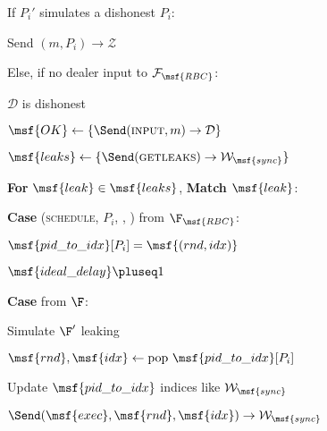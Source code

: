 
\begin{bbox}[title={Algorithm $\msf{SimPartyOutput}(m, P_i')$}]

	\begin{renumerate}
		\item If $P_i'$ simulates a dishonest $P_i$:
		\begin{renumerate}	

			\item Send $(m, P_i) \rightarrow \mathcal{Z}$
		\end{renumerate}

		\item Else, if no dealer input to $\mathcal{F}_\msf{RBC}$:
		\begin{renumerate}

			\item \Assert $\mathcal{D}$ is dishonest

			\item $\msf{OK} \leftarrow \{ \Send (\textsc{input}, m) \rightarrow \mathcal{D} \}$

			\item $\msf{leaks} \leftarrow \{ \Send (\textsc{getleaks}) \rightarrow \mathcal{W}_\msf{sync}\}$
		
			\item {\bf For} $\msf{leak} \in \msf{leaks}$, {\bf Match} $\msf{leak}$:
						\begin{renumerate}
							\item {\bf Case} (\textsc{schedule}, $P_i$, , ) from $\F_\msf{RBC}$:

								\quad $\msf{pid\_to\_idx}[P_i] = \msf{(rnd, idx)}$

								\quad $\msf{ideal\_delay} \pluseq 1$

							\item {\bf Case}  from $\F$:
					
								\quad Simulate $\F'$ leaking 

						\end{renumerate}
		\end{renumerate}
		\item $\msf{rnd}, \msf{idx} \leftarrow \text{pop } \msf{pid\_to\_idx}[P_i]$

		\item Update $\msf{pid\_to\_idx}$ indices like $\mathcal{W}_\msf{sync}$

		\item $\Send (\msf{exec}, \msf{rnd}, \msf{idx}) \rightarrow \mathcal{W}_\msf{sync}$
		
	\end{renumerate}

\end{bbox}
